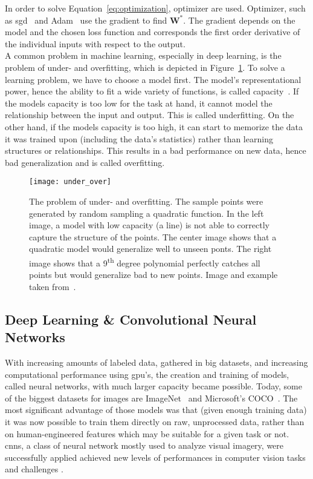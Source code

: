 In order to solve Equation~\ref{eq:optimization}, optimizer are used. Optimizer, such as \gls{sgd}~\cite{Goodfellow2016DeepLearning} and Adam~\cite{Kingma2014Adam:Optimization} use the gradient to find $\textbf{W}^*$. The gradient depends on the model and the chosen loss function and corresponds the first order derivative of the individual inputs with respect to the output.\\

A common problem in machine learning, especially in deep learning, is the problem of under- and overfitting, which is depicted in Figure~\ref{fig:under_over_fitting}. To solve a learning problem, we have to choose a model first. The model's representational power, hence the ability to fit a wide variety of functions, is called capacity~\cite{Goodfellow2016DeepLearning}. If the models capacity is too low for the task at hand, it cannot model the relationship between the input and output. This is called underfitting. On the other hand, if the models capacity is too high, it can start to memorize the data it was trained upon (including the data's statistics) rather than learning structures or relationships. This results in a bad performance on new data, hence bad generalization and is called overfitting.

\begin{figure}[htbp]
    \centering
	\texttt{[image: under\_over]}
    \caption[Under- and Overfitting]{The problem of under- and overfitting. The sample points were generated by random sampling a quadratic function. In the left image, a model with low capacity (a line) is not able to correctly capture the structure of the points. The center image shows that a quadratic model would generalize well to unseen ponts. The right image shows that a 9\textsuperscript{th} degree polynomial perfectly catches all points but would generalize bad to new points. Image and example taken from~\cite{Goodfellow2016DeepLearning}.}
    \label{fig:under_over_fitting}
\end{figure}

\subsection{Deep Learning \& Convolutional Neural Networks}
With increasing amounts of labeled data, gathered in big datasets, and increasing computational performance using \gls{gpu}'s, the creation and training of models, called neural networks, with much larger capacity became possible. Today, some of the biggest datasets for images are ImageNet~\cite{Russakovsky2015ImageNetChallenge} and Microsoft's COCO~\cite{Lin2014MicrosoftContext}.
The most significant advantage of those models was that (given enough training data) it was now possible to train them directly on raw, unprocessed data, rather than on human-engineered features which may be suitable for a given task or not.
\gls{cnn}s, a class of neural network mostly used to analyze visual imagery, were successfully applied \cite{Lecun2015DeepLearning} achieved new levels of performances in computer vision tasks and challenges \cite{Krizhevsky2012ImageNetNetworks,Simonyan2014VeryRecognition}.

